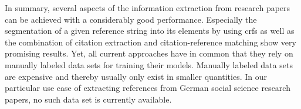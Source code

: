 \bigskip



%


\bigskip

In summary, several aspects of the information extraction from research papers can be achieved with a considerably good performance.
Especially the segmentation of a given reference string into its elements by using \glspl{crf} \citep{peng2004accurate,councill2008parscit,groza2012reference} as well as the combination of citation extraction and citation-reference matching \citep{powley2007evidence} show very promising results.
Yet, all current approaches have in common that they rely on manually labeled data sets for training their models.
Manually labeled data sets are expensive and thereby usually only exist in smaller quantities.
In our particular use case of extracting references from German social science research papers, no such data set is currently available.

